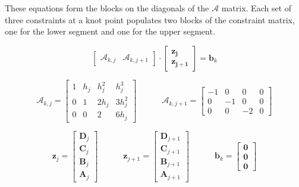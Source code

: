 These equations form the blocks on the diagonals of the $\mathcal{A}$ matrix.
Each set of three constraints at a knot point populates two blocks of the constraint matrix,
one for the lower segment and one for the upper segment.


\begin{equation}
\begin{bmatrix}
\mathcal{A}_{k, j} & \mathcal{A}_{k, j+1}
\end{bmatrix}
\cdot
\begin{bmatrix}
\bm{z_j} \\
\bm{z_{j+1}}
\end{bmatrix}
=
\bm{b}_k
\label{eqn:continuityEquationsSymbols}
\end{equation}


\begin{equation}

\mathcal{A}_{k, j}
=
\begin{bmatrix}
1 & h_j & h_j^2  & h_j^3 \\
0 & 1   & 2 h_j  & 3 h_j^2 \\
0 & 0   & 2      & 6 h_j
\end{bmatrix}

\quad \quad \quad

\mathcal{A}_{k, j+1}
=
\begin{bmatrix}
-1 & 0 & 0  & 0 \\
0 & -1   & 0  & 0 \\
0 & 0   & -2      & 0
\end{bmatrix}

\label{eqn:continuityEquationExplicitPartOne}
\end{equation}


\begin{equation}

\bm{z}_j
=
\begin{bmatrix}
\bm{D}_j \\
\bm{C}_j \\
\bm{B}_j \\
\bm{A}_j
\end{bmatrix}

\quad \quad \quad

\bm{z}_{j+1}
=
\begin{bmatrix}
\bm{D}_{j+1} \\
\bm{C}_{j+1} \\
\bm{B}_{j+1} \\
\bm{A}_{j+1}
\end{bmatrix}

\quad \quad \quad

\bm{b}_k
=
\begin{bmatrix}
\bm{0} \\
\bm{0} \\
\bm{0}
\end{bmatrix}


\label{eqn:continuityEquationExplicitPartTwo}
\end{equation}


